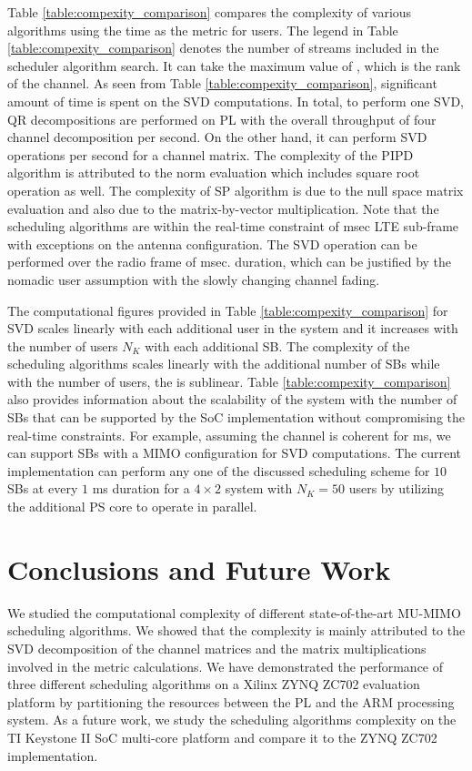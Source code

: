 \documentclass[conference,letterpaper,10pt]{./../../IEEE/IEEEtran}
\begin{document}
Table \ref{table:compexity_comparison} compares the complexity of various algorithms using the time as the metric for  users. The legend \me{\lambda} in Table \ref{table:compexity_comparison} denotes the number of streams included in the scheduler algorithm search. It can take the maximum value of \me{\kappa}, which is the rank of the channel. As seen from Table \ref{table:compexity_comparison}, significant amount of time is spent on the SVD computations. In total, to perform one SVD,  QR decompositions are performed on PL with the overall throughput of four  channel decomposition per second. On the other hand, it can perform  SVD operations per second for a  channel matrix. The complexity of the PIPD algorithm is attributed to the norm evaluation which includes square root operation as well. The complexity of SP algorithm is due to the null space matrix evaluation and also due to the matrix-by-vector multiplication. Note that the scheduling algorithms are within the real-time constraint of  msec LTE sub-frame with exceptions on the  antenna configuration. The SVD operation can be performed over the radio frame of  msec. duration, which can be justified by the nomadic user assumption with the slowly changing channel fading.

The computational figures provided in Table \ref{table:compexity_comparison} for SVD scales linearly with each additional user in the system and it increases with the number of users $N_K$ with each additional SB. The complexity of the scheduling algorithms scales linearly with the additional number of SBs while with the number of users, the  is sublinear. Table \ref{table:compexity_comparison} also provides information about the scalability of the system with the number of SBs that can be supported by the \ac{SoC} implementation without compromising the real-time constraints. For example, assuming the channel is coherent for  ms, we can support  SBs with a  MIMO configuration for SVD computations. The current implementation can perform any one of the discussed scheduling scheme for $10$ SBs at every $1$ ms duration for a $4 \times 2$ system with $N_K = 50$ users by utilizing the additional PS core to operate in parallel.

\acresetall {}
\section{Conclusions and Future Work}
\label{sec:conclusion}
We studied the computational complexity of different state-of-the-art MU-MIMO scheduling algorithms. We showed that the complexity is mainly attributed to the SVD decomposition of the channel matrices and the matrix multiplications involved in the metric calculations. We have demonstrated the performance of three different scheduling algorithms on a Xilinx ZYNQ ZC702 evaluation platform by partitioning the resources between the PL and the ARM processing system. As a future work, we study the scheduling algorithms complexity on the TI Keystone II \ac{SoC} multi-core platform and compare it to the ZYNQ ZC702 implementation.
\end{document}
